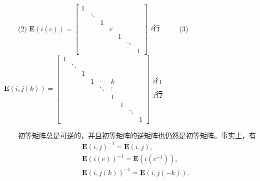 \documentclass[compress,mathserif,cjk]{beamer}
\theoremstyle{remark}
\numberwithin{equation}{section}
\begin{document}
\begin{CJK}{UTF8}{gbsn}
\begin{frame}\small
 \ \ \ \ (2) $\bm E(i(c))=\left[\begin{matrix}1&&&&&&\\&\ddots&&&&&\\&&1&&&&\\&&&c&&&\\&&&&1&&\\&&&&&\ddots&\\&&&&&&1\end{matrix}\right]
 \begin{matrix} \\i\mbox{行}\\ \\\end{matrix}$
 \pause\vskip 5pt
 \ \ \ \ (3) $\bm E(i,j(k))=\left[\begin{matrix}1&&&&&&&&\\ &\ddots&&&&&&&\\&&1&&&&&&\\&&&1&\cdots&k&&&\\&&&&\ddots&\vdots&&&\\ &&&&&1&&&\\&&&&&&1&&\\&&&&&&&\ddots&\\&&&&&&&&1\end{matrix}\right]
 \begin{matrix} \\i\mbox{行}\\ \\j\mbox{行}\\ \\\end{matrix}$
\end{frame}

\begin{frame}
 \ \ \ \ 初等矩阵总是可逆的，并且初等矩阵的逆矩阵也仍然是初等矩阵。事实上，有
 \begin{eqnarray*}
 && \bm E(i,j)^{-1}=\bm E(i,j),\\
 &&\bm E(i(c))^{-1}=\bm E(i(c^{-1})),\\
 &&\bm E(i,j(k))^{-1}=\bm E(i,j(-k)).
 \end{eqnarray*}

\end{frame}


\end{CJK}
\end{document}
